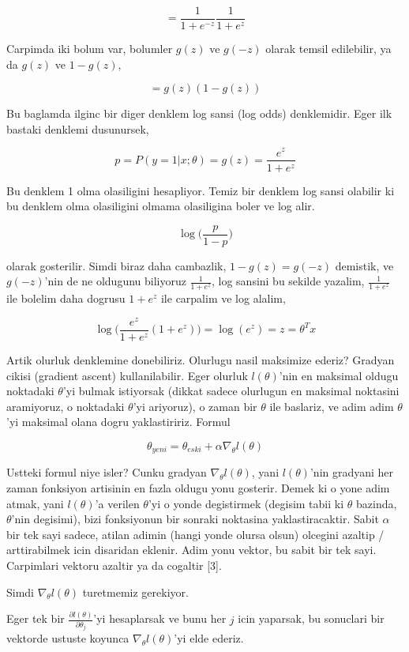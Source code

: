 \documentclass[12pt,fleqn]{article}\usepackage{../common}
\begin{document}
$$
 = \frac{1}{1+e^{-z}} \frac{1}{1+e^{z}}
 $$

Carpimda iki bolum var, bolumler $g(z)$ ve $g(-z)$ olarak temsil
edilebilir, ya da  $g(z)$ ve $1-g(z)$, 

$$
 = g(z)(1-g(z))
$$

Bu baglamda ilginc bir diger denklem log sansi (log odds) denklemidir. Eger
ilk bastaki denklemi dusunursek,

$$ p = P(y=1|x;\theta) = g(z) = \frac{e^{z}}{1+e^{z}}  $$

Bu denklem 1 olma olasiligini hesapliyor. Temiz bir denklem log sansi
olabilir ki bu denklem olma olasiligini olmama olasiligina boler ve log alir.

$$ \log \bigg( \frac{p}{1-p} \bigg)$$

olarak gosterilir. Simdi biraz daha cambazlik, $1 - g(z) = g(-z)$ demistik,
ve $g(-z)$'nin de ne oldugunu biliyoruz $\frac{1}{1+e^{z}}$, log sansini bu
sekilde yazalim, $\frac{1}{1+e^{z}}$ ile bolelim daha dogrusu $1+e^{z}$ ile
carpalim ve log alalim,

$$ 
\log \bigg( \frac{e^{z}}{1+e^{z}} (1+e^{z})  \bigg) 
= \log(e^{z}) 
= z = \theta^Tx
$$

Artik olurluk denklemine donebiliriz. Olurlugu nasil maksimize ederiz?
Gradyan cikisi (gradient ascent) kullanilabilir. Eger olurluk
$l(\theta)$'nin en maksimal oldugu noktadaki $\theta$'yi bulmak
istiyorsak (dikkat sadece olurlugun en maksimal noktasini aramiyoruz,
o noktadaki $\theta$'yi ariyoruz), o zaman bir $\theta$ ile baslariz,
ve adim adim $\theta$'yi maksimal olana dogru yaklastiririz. Formul

$$ \theta_{yeni} = \theta_{eski} + \alpha \nabla_\theta l(\theta)$$

Ustteki formul niye isler? Cunku gradyan $\nabla_\theta l(\theta)$,
yani $l(\theta)$'nin gradyani her zaman fonksiyon artisinin en fazla
oldugu yonu gosterir. Demek ki o yone adim atmak, yani $l(\theta)$'a
verilen $\theta$'yi o yonde degistirmek (degisim tabii ki $\theta$
bazinda, $\theta$'nin degisimi), bizi fonksiyonun bir sonraki
noktasina yaklastiracaktir. Sabit $\alpha$ bir tek sayi sadece, atilan
adimin (hangi yonde olursa olsun) olcegini azaltip / arttirabilmek
icin disaridan eklenir. Adim yonu vektor, bu sabit bir tek
sayi. Carpimlari vektoru azaltir ya da cogaltir [3].

Simdi $\nabla_\theta l(\theta)$ turetmemiz gerekiyor.

Eger tek bir $\frac{\partial l(\theta)}{\partial \theta_j}$'yi
hesaplarsak ve bunu her $j$ icin yaparsak, bu sonuclari bir vektorde
ustuste koyunca $\nabla_\theta l(\theta)$'yi elde ederiz.
\end{document}
